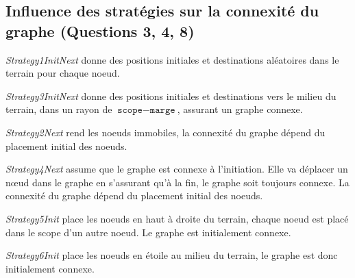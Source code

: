 \documentclass[a4paper]{article}
\begin{document}
\subsection{Influence des stratégies sur la connexité du graphe (Questions 3, 4, 8)}
\begin{minipage}{0.45\textwidth}


  \textsl{Strategy1InitNext} donne des positions initiales et destinations
aléatoires dans le terrain pour chaque noeud.

\textsl{Strategy3InitNext} donne des positions initiales et
    destinations vers le milieu du terrain, dans un rayon de $ \texttt{scope} -
\texttt{marge} $, assurant un graphe
    connexe.

    \textsl{Strategy2Next} rend les noeuds immobiles, la connexité du
      graphe dépend du placement initial des noeuds.

     \textsl{Strategy4Next} assume que le graphe est connexe à
    l'initiation. Elle va déplacer un nœud dans le graphe en
    s'assurant qu'à la fin, le graphe soit toujours connexe. La
    connexité du graphe dépend du placement initial des noeuds.

    \textsl{Strategy5Init} place les noeuds en haut à droite du terrain,
      chaque noeud est placé dans le scope d'un autre noeud.
      Le graphe est initialement connexe.

      \textsl{Strategy6Init} place les noeuds en étoile au milieu du
        terrain, le graphe est donc initialement connexe.\\

\end{minipage}%
\hfill
\end{document}

